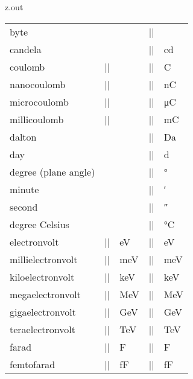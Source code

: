 \begin{VerbatimOut}{z.out}
{\begin{longtable}{@{}lllll@{}}
    byte&                 &        &             |\byte|&               \unit{\byte}\\[6pt]
    candela&              &        &             |\candela|&            \unit{\candela}\\[6pt]
    coulomb&              |\C|&    \unit{\C}&    |\coulomb|&            \unit{\coulomb}\\
    \q nanocoulomb&       |\nC|&   \unit{\nC}&   |\nano\coulomb|&       \unit{\nano\coulomb}\\
    \q microcoulomb&      |\uC|&   \unit{\uC}&   |\micro\coulomb|&      \unit{\micro\coulomb}\\
    \q millicoulomb&      |\mC|&   \unit{\mC}&   |\milli\coulomb|&      \unit{\milli\coulomb}\\[6pt]
    dalton&               &        &             |\dalton|&             \unit{\dalton}\\[6pt]
    day&                  &        &             |\day|&                \unit{\day}\\[6pt]
    degree (plane angle)& &        &             |\degree|&             \unit{\degree}\\
    \q minute&            &        &             |\arcminute|&          \unit{\arcminute}\\
    \q second&            &        &             |\arcsecond|&          \unit{\arcsecond}\\[6pt]
    degree Celsius&       &        &             |\degreeCelsuis|&      \unit{\degreeCelsius}\\[6pt]
    electronvolt&         |\eV|&   \unit{\eV}&   |\electronvolt|&       \unit{\electronvolt}\\
    \q millielectronvolt& |\meV|&  \unit{\meV}&  |\milli\electronvolt|& \unit{\milli\electronvolt}\\
    \q kiloelectronvolt&  |\keV|&  \unit{\keV}&  |\kilo\electronvolt|&  \unit{\kilo\electronvolt}\\
    \q megaelectronvolt&  |\MeV|&  \unit{\MeV}&  |\mega\electronvolt|&  \unit{\mega\electronvolt}\\
    \q gigaelectronvolt&  |\GeV|&  \unit{\GeV}&  |\giga\electronvolt|&  \unit{\giga\electronvolt}\\
    \q teraelectronvolt&  |\TeV|&  \unit{\TeV}&  |\tera\electronvolt|&  \unit{\tera\electronvolt}\\[6pt]
    farad&                |\F|&    \unit{\F}&    |\farad|&              \unit{\farad}\\
    \q femtofarad&        |\fF|&   \unit{\fF}&   |\femto\farad|&        \unit{\femto\farad}\\

\end{longtable}}
\end{VerbatimOut}
